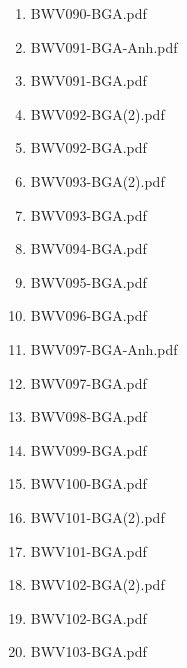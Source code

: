\documentclass[11pt]{article}
\begin{document}
\begin{enumerate}
\begin{enumerate}
\begin{enumerate}
\item BWV090-BGA.pdf
\label{sec-1-1-1-1-44-6-7-1-102}

\item BWV091-BGA-Anh.pdf
\label{sec-1-1-1-1-44-6-7-1-103}

\item BWV091-BGA.pdf
\label{sec-1-1-1-1-44-6-7-1-104}

\item BWV092-BGA(2).pdf
\label{sec-1-1-1-1-44-6-7-1-105}

\item BWV092-BGA.pdf
\label{sec-1-1-1-1-44-6-7-1-106}

\item BWV093-BGA(2).pdf
\label{sec-1-1-1-1-44-6-7-1-107}

\item BWV093-BGA.pdf
\label{sec-1-1-1-1-44-6-7-1-108}

\item BWV094-BGA.pdf
\label{sec-1-1-1-1-44-6-7-1-109}

\item BWV095-BGA.pdf
\label{sec-1-1-1-1-44-6-7-1-110}

\item BWV096-BGA.pdf
\label{sec-1-1-1-1-44-6-7-1-111}

\item BWV097-BGA-Anh.pdf
\label{sec-1-1-1-1-44-6-7-1-112}

\item BWV097-BGA.pdf
\label{sec-1-1-1-1-44-6-7-1-113}

\item BWV098-BGA.pdf
\label{sec-1-1-1-1-44-6-7-1-114}

\item BWV099-BGA.pdf
\label{sec-1-1-1-1-44-6-7-1-115}

\item BWV100-BGA.pdf
\label{sec-1-1-1-1-44-6-7-1-116}

\item BWV101-BGA(2).pdf
\label{sec-1-1-1-1-44-6-7-1-117}

\item BWV101-BGA.pdf
\label{sec-1-1-1-1-44-6-7-1-118}

\item BWV102-BGA(2).pdf
\label{sec-1-1-1-1-44-6-7-1-119}

\item BWV102-BGA.pdf
\label{sec-1-1-1-1-44-6-7-1-120}

\item BWV103-BGA.pdf
\label{sec-1-1-1-1-44-6-7-1-121}


\end{enumerate}
\end{enumerate}
\end{enumerate}
\end{document}

